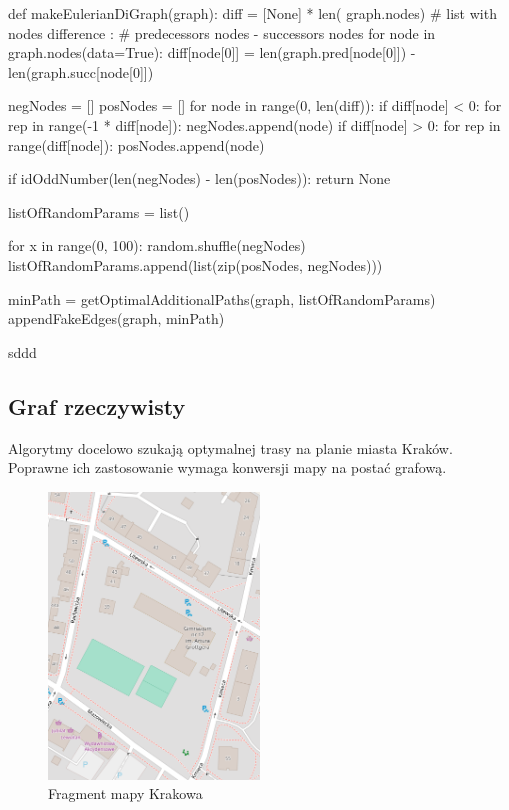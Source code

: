 \documentclass[a4paper, 12pt, twoside, openright]{article}
\begin{document}
\begin{algorithm}[caption={\textit{makeEulerianDiGraph} przekształcający graf skierowany do grafu Eulera}, label={makeeulerianDG}]
def makeEulerianDiGraph(graph):
	diff = [None] * len(
			graph.nodes)  # list with nodes difference : 
			    	      # predecessors nodes - successors nodes
	for node in graph.nodes(data=True):
		diff[node[0]] = len(graph.pred[node[0]]) - len(graph.succ[node[0]])
	
	negNodes = []
	posNodes = []
	for node in range(0, len(diff)):
		if diff[node] < 0:
			for rep in range(-1 * diff[node]):
				negNodes.append(node)
		if diff[node] > 0:
			for rep in range(diff[node]):
				posNodes.append(node)
	
	if idOddNumber(len(negNodes) - len(posNodes)):
		return None
	
	listOfRandomParams = list()
	
	for x in range(0, 100):
		random.shuffle(negNodes)
		listOfRandomParams.append(list(zip(posNodes, negNodes)))
	
	minPath = getOptimalAdditionalPaths(graph, listOfRandomParams)
	appendFakeEdges(graph, minPath)   
\end{algorithm}
sddd


\subsection{Graf rzeczywisty}\label{grafRzecz}
\indent\par
Algorytmy docelowo szukają optymalnej trasy na planie miasta Kraków. Poprawne ich zastosowanie wymaga konwersji mapy na postać grafową. 

\begin{figure}[htb]
	\centering
	\includegraphics[width=0.5\textwidth]{OSM1}
	\caption[]{Fragment mapy Krakowa\footnotemark}
	\label{osm1}
\end{figure}
\end{document}

